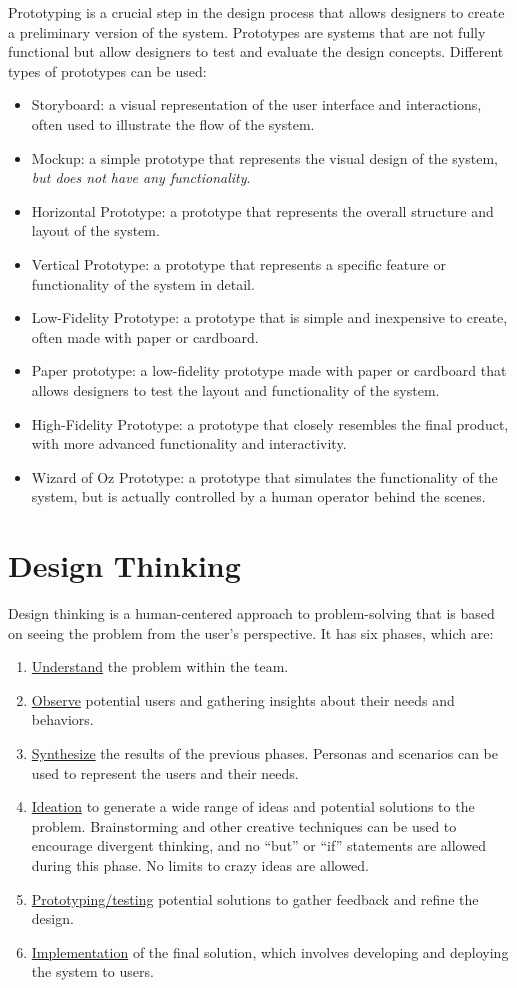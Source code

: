 Prototyping is a crucial step in the design process that allows designers to create a preliminary version of the system. Prototypes are systems that are not fully functional but allow designers to test and evaluate the design concepts. Different types of prototypes can be used:
\begin{itemize}
    \item Storyboard: a visual representation of the user interface and interactions, often used to illustrate the flow of the system.
    \item Mockup: a simple prototype that represents the visual design of the system, \emph{but does not have any functionality}.
    \item Horizontal Prototype: a prototype that represents the overall structure and layout of the system.
    \item Vertical Prototype: a prototype that represents a specific feature or functionality of the system in detail.
    \item Low-Fidelity Prototype: a prototype that is simple and inexpensive to create, often made with paper or cardboard.
    \item Paper prototype: a low-fidelity prototype made with paper or cardboard that allows designers to test the layout and functionality of the system.
    \item High-Fidelity Prototype: a prototype that closely resembles the final product, with more advanced functionality and interactivity.
    \item Wizard of Oz Prototype: a prototype that simulates the functionality of the system, but is actually controlled by a human operator behind the scenes.
\end{itemize}


\section{Design Thinking}

Design thinking is a human-centered approach to problem-solving that is based on seeing the problem from the user's perspective. It has six phases, which are:
\begin{enumerate}
    \item \ul{Understand} the problem within the team.
    \item \ul{Observe} potential users and gathering insights about their needs and behaviors.
    \item \ul{Synthesize} the results of the previous phases. Personas and scenarios can be used to represent the users and their needs.
    \item \ul{Ideation} to generate a wide range of ideas and potential solutions to the problem. Brainstorming and other creative techniques can be used to encourage divergent thinking, and no ``but'' or ``if'' statements are allowed during this phase. No limits to crazy ideas are allowed.
    \item \ul{Prototyping/testing} potential solutions to gather feedback and refine the design.
    \item \ul{Implementation} of the final solution, which involves developing and deploying the system to users.
\end{enumerate}